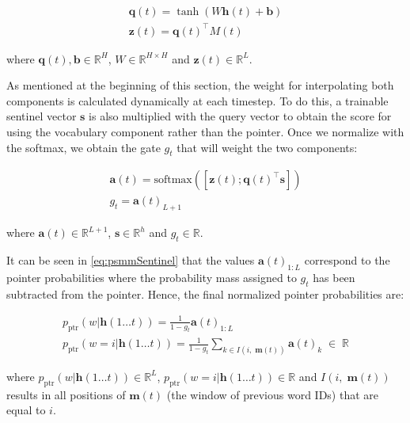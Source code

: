 \begin{equation} \label{eq:psmmScores}
	\begin{gathered} 
		\mathbf{q}(t) = \tanh(W\mathbf{h}(t) + \mathbf{b}) \\
		\mathbf{z}(t) = \mathbf{q}(t)^{\top} M(t)
	\end{gathered}
\end{equation}

where $\mathbf{q}(t),\mathbf{b} \in \mathbb{R}^{H}$, $W \in \mathbb{R}^{H \times H}$ and $\mathbf{z}(t) \in \mathbb{R}^{L}$. 

As mentioned at the beginning of this section, the weight for interpolating both components is calculated dynamically at each timestep. To do this, a trainable sentinel vector $\mathbf{s}$ is also multiplied with the query vector to obtain the score for using the vocabulary component rather than the pointer. Once we normalize with the softmax, we obtain the gate $g_t$ that will weight the two components:

\begin{equation} \label{eq:psmmSentinel}
	\begin{gathered} 
		\mathbf{a}(t) = \text{softmax}([\mathbf{z}(t); \mathbf{q}(t)^{\top} \mathbf{s}]) \\
		g_t = \mathbf{a}(t)_{L+1}
	\end{gathered} 
\end{equation}

where $\mathbf{a}(t) \in \mathbb{R}^{L+1}$, $\mathbf{s} \in \mathbb{R}^{h}$ and $g_t \in \mathbb{R}$.

It can be seen in \autoref{eq:psmmSentinel} that the values $\mathbf{a}(t)_{1:L}$ correspond to the pointer probabilities where the probability mass assigned to $g_t$ has been subtracted from the pointer. Hence, the final normalized pointer probabilities are:

\begin{equation}
	\begin{gathered}
		p_{\text{ptr}}(w|\mathbf{h}(1\ldots t)) = \frac{1}{1-g_t}\mathbf{a}(t)_{1:L} \\
		p_{\text{ptr}}(w=i|\mathbf{h}(1\ldots t)) = \frac{1}{1-g_t}\sum_{k \in I(i, \; \mathbf{m}(t))}\mathbf{a}(t)_k \; \in \; \mathbb{R}
	\end{gathered}
\end{equation}

where $p_{\text{ptr}}(w|\mathbf{h}(1\ldots t)) \in \mathbb{R}^{L}$, $p_{\text{ptr}}(w=i|\mathbf{h}(1\ldots t)) \in \mathbb{R}$ and $I(i, \; \mathbf{m}(t))$ results in all positions of $\mathbf{m}(t)$ (the window of previous word IDs) that are equal to $i$.

